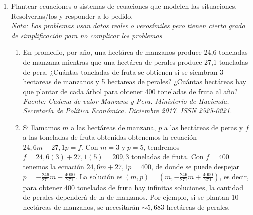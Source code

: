 \documentclass[a4paper]{article}
\makeatletter
\newcommand{\answer}{\item[**]}
\newcommand{\exercise}{\item}
\newenvironment{amatrix}[1]{%
  \left(\begin{array}{@{}*{#1}{c}|c@{}}
}{%
  \end{array}\right)
}
\makeatother
\begin{document}
\begin{enumerate}
\begin{multicols}{2}
\begin{enumerate} [label=(\alph*)]
		\item $\begin{amatrix}{4} 1 & -1 & 2 & 3 & -2 \\ 0 & 0 & 0 & 0 & 3 \\ 0 & 0 & 0 & 0 & 0 \end{amatrix}$
		\answer $rg(A)=1 \neq rg(A^*)=2$. Sistema incompatible. $S=\emptyset$.

		\item $\begin{amatrix}{4} 1 & 0 & 0 & -1 & \frac{1}{2} \\ 0 & 0 & 1 & \frac{3}{4} & 2 \\ 0 & 0 & 0 & 0 & 0 \end{amatrix}$
		\answer $rg(A)=rg(A^*)=2<n=4$. Sistema compatible indeterminado cuya solución depende de 2 parámetros. \\ $(x,y,z,w)=(\frac{1}{2}+w,y,2-\frac{3}{4}w,w)$. \\ $S=\left\{(x,y,z,w)\in \mathbb{R}^4 ~|~ x=\frac{1}{2}+w ~\land~ z=\frac{3}{4}w ~\land~ w=0 \right\}$. \\ Con $y=1$ y $w=1$ $\to (\frac{3}{2},1,\frac{5}{4},1)$. Con $y=1$ y $w=2$ $\to (\frac{5}{2},1,\frac{1}{2},2)$. Con $y=2$ y $w=0$ $\to (\frac{1}{2},2,2,0)$.

	\end{enumerate}
	\end{multicols}

	\exercise Plantear ecuaciones o sistemas de ecuaciones que modelen las situaciones. Resolverlas/los y responder a lo pedido. \\ \textit{Nota: Los problemas usan datos reales o verosímiles pero tienen cierto grado de simplificación para no complicar los problemas}
	\begin{enumerate} [label=(\alph*)]

		\item En promedio, por año, una hectárea de manzanos produce 24,6 toneladas de manzana mientras que una hectárea de perales produce 27,1 toneladas de pera. ¿Cuántas toneladas de fruta se obtienen si se siembran 3 hectareas de manzanos y 5 hectareas de perales? ¿Cuántas hectáreas hay que plantar de cada árbol para obtener 400 toneladas de fruta al año? \\ \textit{Fuente: Cadena de valor Manzana y Pera. Ministerio de Hacienda. Secretaría de Política Económica. Diciembre 2017. ISSN 2525-0221.}
		\answer Si llamamos $m$ a las hectáreas de manzana, $p$ a las hectáreas de peras y $f$ a las toneladas de fruta obtenidas obtenemos la ecuación $24,6 m + 27,1 p = f$. Con $m=3$ y $p=5$, tendremos $f=24,6 (3)+27,1(5)=209,3$ toneladas de fruta. Con $f=400$ tenemos la ecuación $24,6 m + 27,1 p = 400$, de donde se puede despejar $p=-\frac{246}{271}m+\frac{4000}{271}$. La solución es $(m,p)=\left(m,-\frac{246}{271}m+\frac{4000}{271}\right)$, es decir, para obtener 400 toneladas de fruta hay infinitas soluciones, la cantidad de perales dependerá de la de manzanos. Por ejemplo, si se plantan 10 hectáreas de manzanos, se necesitarán $\sim5,683$ hectáreas de perales.


\end{enumerate}
\end{enumerate}
\end{document}
